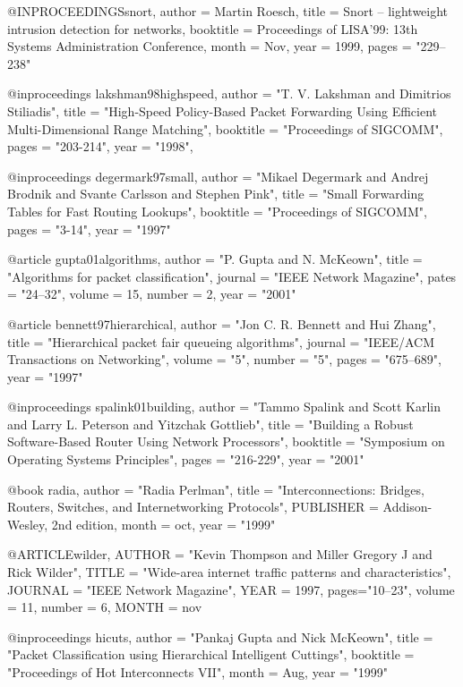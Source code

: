 @INPROCEEDINGS{snort,
           author = {Martin Roesch},
           title = {Snort -- lightweight intrusion detection for networks},
           booktitle = {Proceedings of LISA'99: 13th Systems Administration Conference},
           month = Nov,
           year = 1999,
           pages = "229--238"           
}

@inproceedings{ lakshman98highspeed,
    author = "T. V. Lakshman and Dimitrios Stiliadis",
    title = "High-Speed Policy-Based Packet Forwarding Using Efficient Multi-Dimensional Range Matching",
    booktitle = "Proceedings of {SIGCOMM}",
    pages = "203-214",
    year = "1998",
}

@inproceedings{ degermark97small,
    author = "Mikael Degermark and Andrej Brodnik and Svante Carlsson and Stephen Pink",
    title = "Small Forwarding Tables for Fast Routing Lookups",
    booktitle = "Proceedings of {SIGCOMM}",
    pages = "3-14",
    year = "1997" }

@article{ gupta01algorithms,
  author = "P. Gupta and N. McKeown",
  title = "Algorithms for packet classification",
  journal = "IEEE Network Magazine",
  pates =  "24--32",
  volume = 15,
  number = 2, 
  year = "2001" }


@article{ bennett97hierarchical,
    author = "Jon C. R. Bennett and Hui Zhang",
    title = "Hierarchical packet fair queueing algorithms",
    journal = "IEEE\slash ACM Transactions on Networking",
    volume = "5",
    number = "5",
    pages = "675--689",
    year = "1997" }

@inproceedings{ spalink01building,
    author = "Tammo Spalink and Scott Karlin and Larry L. Peterson and Yitzchak Gottlieb",
    title = "Building a Robust Software-Based Router Using Network Processors",
    booktitle = "Symposium on Operating Systems Principles",
    pages = "216-229",
    year = "2001"
}

@book{ radia,
    author = "Radia Perlman",
    title = "Interconnections: Bridges, Routers, Switches, and Internetworking Protocols",
    PUBLISHER = {Addison-Wesley, 2nd edition},
    month = oct,
    year = "1999"
}

@ARTICLE{wilder,
	AUTHOR = "Kevin Thompson and Miller Gregory J and Rick Wilder",
	TITLE = "Wide-area internet traffic patterns and characteristics",
	JOURNAL = "IEEE Network Magazine",
	YEAR = 1997,
	pages="10--23",
	volume		= 11,
	number		= 6,
	MONTH = nov
}

@inproceedings{ hicuts,
    author = "Pankaj Gupta and Nick McKeown",
    title = "Packet Classification using Hierarchical Intelligent Cuttings",
    booktitle = "Proceedings of Hot Interconnects VII",
    month = Aug,
    year = "1999"
}


